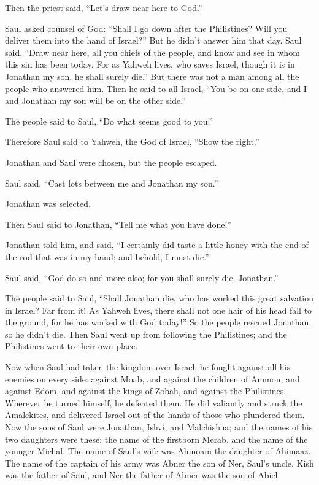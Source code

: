 Then the priest said, ``Let's draw near here to God.''

 Saul asked counsel of God: ``Shall I go down after the
Philistines? Will you deliver them into the hand of Israel?'' But he
didn't answer him that day.  Saul said, ``Draw near here,
all you chiefs of the people, and know and see in whom this sin has been
today.  For as Yahweh lives, who saves Israel, though it
is in Jonathan my son, he shall surely die.'' But there was not a man
among all the people who answered him.  Then he said to
all Israel, ``You be on one side, and I and Jonathan my son will be on
the other side.''

The people said to Saul, ``Do what seems good to you.''

 Therefore Saul said to Yahweh, the God of Israel, ``Show
the right.''

Jonathan and Saul were chosen, but the people escaped.

 Saul said, ``Cast lots between me and Jonathan my son.''

Jonathan was selected.

 Then Saul said to Jonathan, ``Tell me what you have
done!''

Jonathan told him, and said, ``I certainly did taste a little honey with
the end of the rod that was in my hand; and behold, I must die.''

 Saul said, ``God do so and more also; for you shall
surely die, Jonathan.''

 The people said to Saul, ``Shall Jonathan die, who has
worked this great salvation in Israel? Far from it! As Yahweh lives,
there shall not one hair of his head fall to the ground, for he has
worked with God today!'' So the people rescued Jonathan, so he didn't
die.  Then Saul went up from following the Philistines;
and the Philistines went to their own place.

 Now when Saul had taken the kingdom over Israel, he
fought against all his enemies on every side: against Moab, and against
the children of Ammon, and against Edom, and against the kings of Zobah,
and against the Philistines. Wherever he turned himself, he defeated
them.  He did valiantly and struck the Amalekites, and
delivered Israel out of the hands of those who plundered them.
 Now the sons of Saul were Jonathan, Ishvi, and
Malchishua; and the names of his two daughters were these: the name of
the firstborn Merab, and the name of the younger Michal. 
The name of Saul's wife was Ahinoam the daughter of Ahimaaz. The name of
the captain of his army was Abner the son of Ner, Saul's uncle.
 Kish was the father of Saul, and Ner the father of Abner
was the son of Abiel.

